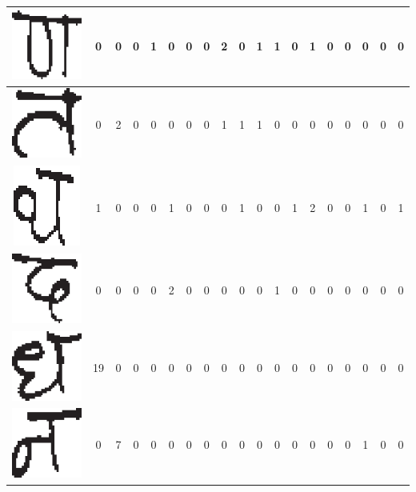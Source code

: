 \begin{table}[h]
\begin{tabular}{|c|c|c|c|c|c|c|c|c|c|c|c|c|c|c|c|c|c|c|}
\hline
\includegraphics[scale=0.25]{figures/datasets/nhcr/consonants/15yna} & 0 & 0 & 0 & 1 & 0 & 0 & 0 & 2 & 0 & 1 & 1 & 0 & 1 & 0 & 0 & 0 & 0 & 0\tabularnewline
\hline
\includegraphics[scale=0.25]{figures/datasets/nhcr/consonants/16ta} & 0 & 2 & 0 & 0 & 0 & 0 & 0 & 1 & 1 & 1 & 0 & 0 & 0 & 0 & 0 & 0 & 0 & 0\tabularnewline
\hline
\includegraphics[scale=0.25]{figures/datasets/nhcr/consonants/17tha} & 1 & 0 & 0 & 0 & 1 & 0 & 0 & 0 & 1 & 0 & 0 & 1 & 2 & 0 & 0 & 1 & 0 & 1\tabularnewline
\hline
\includegraphics[scale=0.25]{figures/datasets/nhcr/consonants/18da} & 0 & 0 & 0 & 0 & 2 & 0 & 0 & 0 & 0 & 0 & 1 & 0 & 0 & 0 & 0 & 0 & 0 & 0\tabularnewline
\hline
\includegraphics[scale=0.25]{figures/datasets/nhcr/consonants/19dha} & 19 & 0 & 0 & 0 & 0 & 0 & 0 & 0 & 0 & 0 & 0 & 0 & 0 & 0 & 0 & 0 & 0 & 0\tabularnewline
\hline
\includegraphics[scale=0.25]{figures/datasets/nhcr/consonants/20na} & 0 & 7 & 0 & 0 & 0 & 0 & 0 & 0 & 0 & 0 & 0 & 0 & 0 & 0 & 0 & 1 & 0 & 0\tabularnewline

\end{tabular}
\end{table}
